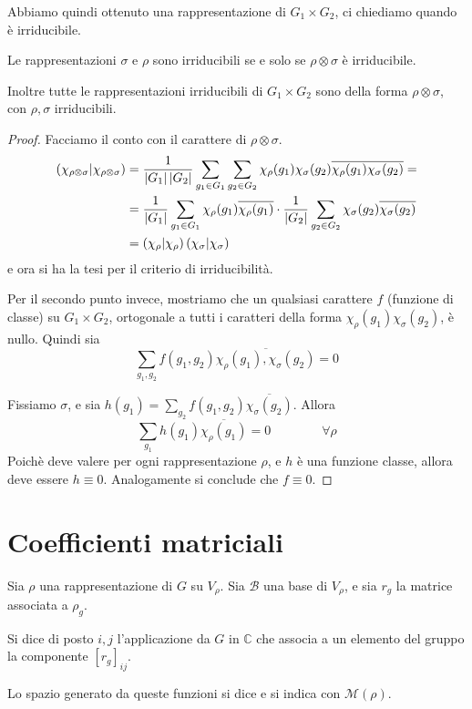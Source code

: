 \documentclass[a4paper,10pt,oneside]{math_article}
\newcommand{\herm}[2]{\left(#1 | #2\right)}
\newcommand{\tensor}{\otimes}
\let\conj\overline
\begin{document}
   Abbiamo quindi ottenuto una rappresentazione di $G_1\times G_2$, ci chiediamo quando è irriducibile. 
   \begin{myprop}
    Le rappresentazioni $\sigma$ e $\rho$ sono irriducibili se e solo se $\rho \tensor \sigma$ è irriducibile.
    
    Inoltre tutte le rappresentazioni irriducibili di $G_1\times G_2$ sono della forma $\rho \tensor \sigma$, con $\rho,\sigma$ irriducibili.
   \end{myprop}
   \begin{proof}
    Facciamo il conto con il carattere di $\rho \tensor \sigma$.
    \begin{align*}
     \herm{\chi_{\rho\tensor\sigma}}{\chi_{\rho\tensor\sigma}} &= \frac1{\abs {G_1}\abs{G_2}}\sum_{g_1 \in G_1}\sum_{g_2\in G_2} \chi_\rho(g_1)\chi_\sigma(g_2)\conj{\chi_\rho(g_1)\chi_\sigma(g_2)} = \\
     &= \frac1{\abs {G_1}}\sum_{g_1 \in G_1} \chi_\rho(g_1)\conj{\chi_\rho(g_1)}\cdot\frac1{\abs {G_2}}\sum_{g_2\in G_2}\chi_\sigma(g_2)\conj{\chi_\sigma(g_2)}\\
     &= \herm{\chi_\rho}{\chi_\rho}\herm{\chi_\sigma}{\chi_\sigma}
    \end{align*}
    e ora si ha la tesi per il criterio di irriducibilità.
    
    Per il secondo punto invece, mostriamo che un qualsiasi carattere $f$ (funzione di classe) su $G_1\times G_2$, ortogonale a tutti i caratteri della forma $\chi_\rho(g_1)\chi_\sigma(g_2)$, è nullo. Quindi sia
    \[
     \sum_{g_1,g_2} f(g_1,g_2) \conj{\chi_\rho(g_1),\chi_\sigma(g_2)}=0
    \]
    
    Fissiamo $\sigma$, e sia $h(g_1)=\sum_{g_2} f(g_1,g_2)\conj{\chi_\sigma(g_2)}$. Allora
    \[
     \sum_{g_1}h(g_1)\conj{\chi_\rho(g_1)}=0 \qquad\qquad \forall \rho
    \]
    Poichè deve valere per ogni rappresentazione $\rho$, e $h$ è una funzione classe, allora deve essere $h\equiv 0$. Analogamente si conclude che $f \equiv 0$.


   \end{proof}

  \section{Coefficienti matriciali}
    \begin{mydef}
     Sia $\rho$ una rappresentazione di $G$ su $V_\rho$. Sia $\mathcal B$ una base di $V_\rho$, e sia $r_g$ la matrice associata a $\rho_g$.
     
     Si dice  di posto $i,j$ l'applicazione da $G$ in $\mathbb C$ che associa a un elemento del gruppo la componente $[r_g]_{ij}$.
     
     Lo spazio generato da queste funzioni si dice  e si indica con $\mathcal M(\rho)$.
    \end{mydef}
\end{document}

